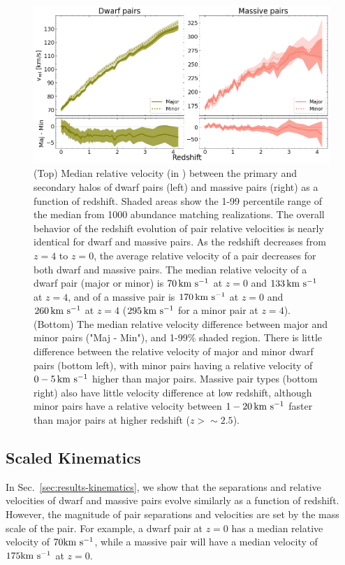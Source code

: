 \documentclass[twocolumn]{aastex631}
\begin{document}
    \begin{figure}[htp]
      \centering
      \includegraphics[width=\textwidth]{vel_1000.png}
      \caption{
        (Top) Median relative velocity (in \kms) between the primary and secondary halos of dwarf pairs (left) and massive pairs (right) as a function of redshift. 
        Shaded areas show the 1-99 percentile range of the median from 1000 abundance matching realizations. 
        The overall behavior of the redshift evolution of pair relative velocities is nearly identical for dwarf and massive pairs.
        As the redshift decreases from $z=4$ to $z=0$, the average relative velocity of a pair decreases for both dwarf and massive pairs.
        The median relative velocity of a dwarf pair (major or minor) is $70\,\mathrm{km}~\mathrm{s}^{-1}$ at $z=0$ and $133\,\mathrm{km}~\mathrm{s}^{-1}$ at $z=4$, and of a massive pair is $170\,\mathrm{km}~\mathrm{s}^{-1}$ at $z=0$ and $260\,\mathrm{km}~\mathrm{s}^{-1}$ at $z=4$ ($295\,\mathrm{km}~\mathrm{s}^{-1}$ for a minor pair at $z=4$). 
        (Bottom) The median relative velocity difference between major and minor pairs ("Maj - Min"), and 1-99\% shaded region.
        There is little difference between the relative velocity of major and minor dwarf pairs (bottom left), with minor pairs having a relative velocity of $0-5\,\mathrm{km}~\mathrm{s}^{-1}$ higher than major pairs. 
        Massive pair types (bottom right) also have little velocity difference at low redshift, although minor pairs have a relative velocity between $1-20\,\mathrm{km}~\mathrm{s}^{-1}$ faster than major pairs at higher redshift ($z>\sim 2.5$).
        }
      \label{fig:vel}
    \end{figure}

\subsection{Scaled Kinematics}\label{sec:results-scaled}
In Sec.~\ref{sec:results-kinematics}, we show that the separations and relative velocities of dwarf and massive pairs evolve similarly as a function of redshift. 
However, the magnitude of pair separations and velocities are set by the mass scale of the pair. 
For example, a dwarf pair at $z=0$ has a median relative velocity of $70\mathrm{km}~\mathrm{s}^{-1}$, while a massive pair will have a median velocity of $175\mathrm{km}~\mathrm{s}^{-1}$ at $z=0$.
\end{document}
